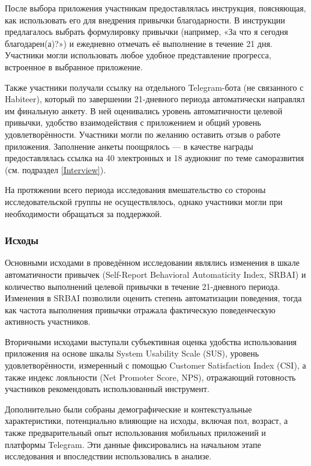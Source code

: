 \documentclass[pdflatex,sn-mathphys-num]{sn-jnl}%
\theoremstyle{thmstyleone}%
\theoremstyle{thmstyletwo}%
\theoremstyle{thmstylethree}%
\begin{document}
После выбора приложения участникам предоставлялась инструкция, поясняющая, как использовать его для внедрения привычки благодарности. В инструкции предлагалось выбрать формулировку привычки (например, «За что я сегодня благодарен(а)?») и ежедневно отмечать её выполнение в течение 21 дня. Участники могли использовать любое удобное представление прогресса, встроенное в выбранное приложение.

Также участники получали ссылку на отдельного Telegram-бота (не связанного с Habiteer), который по завершении 21-дневного периода автоматически направлял им финальную анкету. В ней оценивались уровень автоматичности целевой привычки, удобство взаимодействия с приложением и общий уровень удовлетворённости. Участники могли по желанию оставить отзыв о работе приложения. Заполнение анкеты поощрялось — в качестве награды предоставлялась ссылка на 40 электронных и 18 аудиокниг по теме саморазвития (см. подраздел \ref{Interview}).

На протяжении всего периода исследования вмешательство со стороны исследовательской группы не осуществлялось, однако участники могли при необходимости обращаться за поддержкой.

\subsubsection{Исходы}

Основными исходами в проведённом исследовании являлись изменения в шкале автоматичности привычек (Self-Report Behavioral Automaticity Index, SRBAI) и количество выполнений целевой привычки в течение 21-дневного периода. Изменения в SRBAI позволили оценить степень автоматизации поведения, тогда как частота выполнения привычки отражала фактическую поведенческую активность участников.

Вторичными исходами выступали субъективная оценка удобства использования приложения на основе шкалы System Usability Scale (SUS), уровень удовлетворённости, измеренный с помощью Customer Satisfaction Index (CSI), а также индекс лояльности (Net Promoter Score, NPS), отражающий готовность участников рекомендовать использованный инструмент.

Дополнительно были собраны демографические и контекстуальные характеристики, потенциально влияющие на исходы, включая пол, возраст, а также предварительный опыт использования мобильных приложений и платформы Telegram. Эти данные фиксировались на начальном этапе исследования и впоследствии использовались в анализе.
\end{document}
